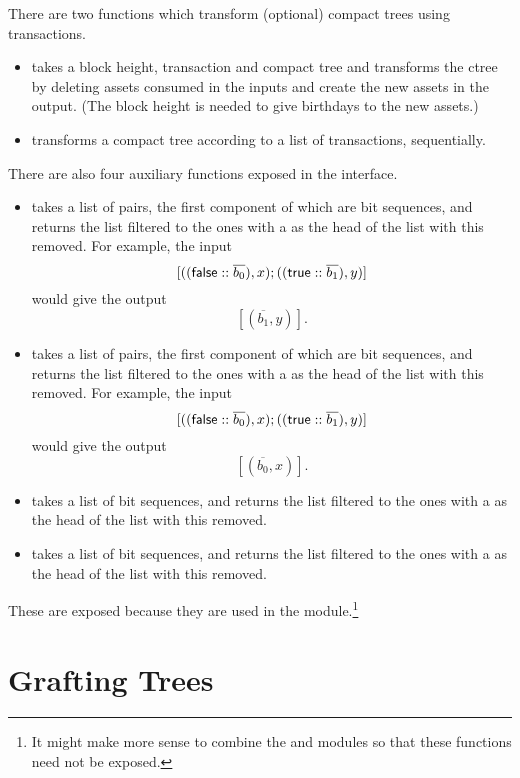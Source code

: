 There are two functions which transform (optional) compact trees using transactions.
\begin{itemize}
\item {} takes a block height, transaction and compact tree
and transforms the ctree by deleting assets consumed in the inputs and
create the new assets in the output. (The block height is needed to give
birthdays to the new assets.)
\item {} transforms a compact tree according to a
list of transactions, sequentially.
\end{itemize}

There are also four auxiliary functions exposed in the interface.
\begin{itemize}
\item {} takes a list of pairs, the first component of which are bit sequences, and returns the list
filtered to the ones with a {} as the head of the list with this {} removed.
For example, the input
$$[((\val{false}::\overline{b_0}),x);((\val{true}::\overline{b_1}),y)]$$
would give the output
$$[(\overline{b_1},y)].$$
\item {} takes a list of pairs, the first component of which are bit sequences, and returns the list
filtered to the ones with a {} as the head of the list with this {} removed.
For example, the input
$$[((\val{false}::\overline{b_0}),x);((\val{true}::\overline{b_1}),y)]$$
would give the output
$$[(\overline{b_0},x)].$$
\item {} takes a list of bit sequences, and returns the list
filtered to the ones with a {} as the head of the list with this {} removed.
\item {} takes a list of bit sequences, and returns the list
filtered to the ones with a {} as the head of the list with this {} removed.
\end{itemize}
These are exposed because they are used in the {} module.\footnote{It might make more sense to combine the {} and {} modules so that these functions need not be exposed.}

\section{Grafting Trees}

